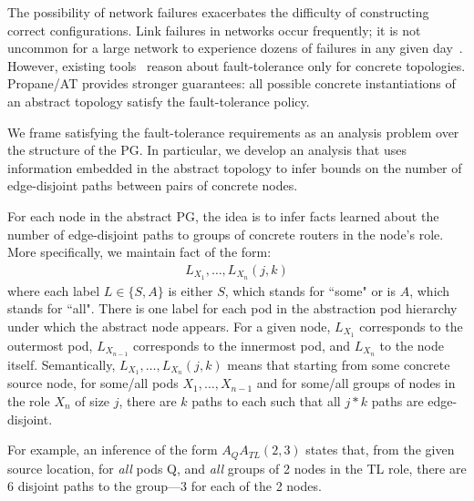 \documentclass[numbers, 10pt]{sigplanconf}
\newcommand{\sysname}{{\text{}\small \sf Propane/AT}\xspace}
\begin{document}

The possibility of network failures exacerbates the difficulty of constructing correct configurations.
Link failures in networks occur frequently; it is not uncommon for a large network to experience dozens of failures in any given day~\cite{dc-failure-study}. However, existing tools~\cite{condor,propane} reason about fault-tolerance only for concrete topologies. \sysname provides stronger guarantees: all possible concrete instantiations of an abstract topology satisfy the fault-tolerance policy.


%
We frame satisfying the fault-tolerance requirements as an analysis problem over the structure of the PG. In particular, we develop an analysis that uses information embedded in the abstract topology to infer bounds on the number of edge-disjoint paths between pairs of concrete nodes.

%
For each node in the abstract PG,
the idea is to infer facts learned about the number of edge-disjoint paths
to groups of concrete routers in the node's role.
More specifically, we maintain fact of the form:
%
\[ \begin{array}{c}
  L_{X_1}, \ldots, L_{X_n}(j,k)
\end{array} \]
\noindent
%
where each label $L \in \{S,A\}$ is either $S$, which stands for ``some" or is $A$, which stands for ``all". There is one label for each pod in the abstraction pod hierarchy under which the abstract node appears. For a given node, $L_{X_1}$ corresponds to the outermost pod, $L_{X_{n-1}}$ corresponds to the innermost pod, and $L_{X_n}$ to the node itself.
Semantically, $L_{X_1}, \ldots, L_{X_n}(j,k)$ means that starting from some concrete source node, for some/all pods $X_1, \ldots, X_{n-1}$
and for some/all groups of nodes in the role $X_n$ of size $j$,
there are $k$ paths to each such that all $j*k$ paths are edge-disjoint.

For example,
an inference of the form $A_{Q} A_{TL}(2,3)$ states that, from the given source location, for \emph{all} pods Q, and \emph{all} groups of 2 nodes in the TL role, there are 6 disjoint paths to the group---3 for each of the 2 nodes.
\end{document}
